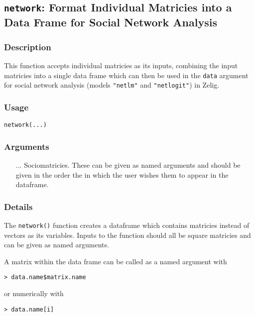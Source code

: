 \subsection{ \texttt{network}: Format Individual Matricies into a Data Frame for Social Network Analysis }\label{network}

\subsubsection{Description}
This function accepts individual matricies as its inputs, combining
the input matricies into a single data frame which can then
be used in the {\tt data} argument for social network analysis (models
\verb|"netlm"| and \verb|"netlogit"|) in Zelig.\\

\subsubsection{Usage}
\begin{verbatim}
network(...)
\end{verbatim}

\subsubsection{Arguments}

\begin{enumerate}
\item[...] Sociomatricies. These can be given as named arguments and should be given in the order the in which the user wishes them to appear in the dataframe.
\end{enumerate}

\subsubsection{Details}
The \verb|network()| function creates a dataframe which contains
matricies instead of vectors as its variables.  Inputs to the function
should all be square matricies and can be given as named arguments. 

\noindent A matrix within the data frame can be called as a named
argument with 
\begin{verbatim}
> data.name$matrix.name 
\end{verbatim} %
or numerically with 
\begin{verbatim}
> data.name[i]
\end{verbatim}


